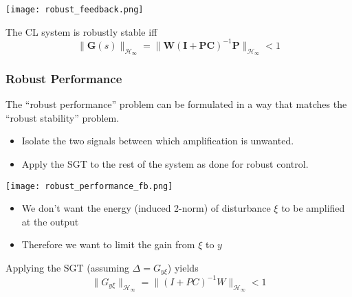 \begin{center}
    \texttt{[image: robust\_feedback.png]}
\end{center}
The CL system is robustly stable iff
\begin{equation*}
    \|\mathbf{G}(s)\|_{\mathcal{H}_\infty}=\|\mathbf{W}{(\mathbf{I}+\mathbf{PC})}^{-1}\mathbf{P}\|_{\mathcal{H}_\infty}<1
\end{equation*}

\subsubsection{Robust Performance}
The “robust performance” problem can be formulated in a way that matches the “robust stability” problem.
\begin{itemize}
    \item Isolate the two signals between which amplification is unwanted.
    \item Apply the SGT to the rest of the system as done for robust control.
\end{itemize}


\begin{center}
    \texttt{[image: robust\_performance\_fb.png]}
\end{center}
\begin{itemize}
    \item We don't want the energy (induced 2-norm) of disturbance $\xi$ to be amplified at the output
    \item Therefore we want to limit the gain from $\xi$ to $y$
\end{itemize}

Applying the SGT (assuming $\Delta=G_{y\xi}$) yields
\begin{equation*}
    \|G_{y\xi}\|_{\mathcal{H}_\infty}=\|(I+PC)^{-1}W\|_{\mathcal{H}_\infty}<1
\end{equation*}

